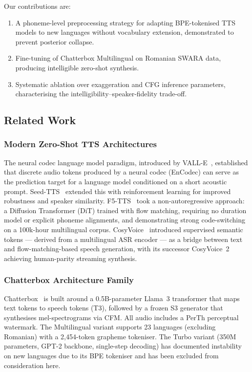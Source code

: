 \documentclass[conference]{IEEEtran}
\begin{document}
Our contributions are:
\begin{enumerate}
\item A phoneme-level preprocessing strategy for adapting
  BPE-tokenised TTS models to new languages without vocabulary
  extension, demonstrated to prevent posterior collapse.
\item Fine-tuning of Chatterbox Multilingual on Romanian SWARA data,
  producing intelligible zero-shot synthesis.
\item Systematic ablation over exaggeration and CFG inference
  parameters, characterising the intelligibility--speaker-fidelity
  trade-off.
\end{enumerate}

\subsection{Related Work}

\subsubsection{Modern Zero-Shot TTS Architectures}

The neural codec language model paradigm, introduced by VALL-E~\cite{valle},
established that discrete audio tokens produced by a neural codec
(EnCodec) can serve as the prediction target for a language model
conditioned on a short acoustic prompt.
Seed-TTS~\cite{seedtts} extended this with reinforcement learning
for improved robustness and speaker similarity.
F5-TTS~\cite{f5tts} took a non-autoregressive approach: a Diffusion
Transformer (DiT) trained with flow matching, requiring no duration
model or explicit phoneme alignments, and demonstrating strong
code-switching on a 100k-hour multilingual corpus.
CosyVoice~\cite{cosyvoice} introduced supervised semantic tokens —
derived from a multilingual ASR encoder — as a bridge between text
and flow-matching-based speech generation, with its successor
CosyVoice~2 achieving human-parity streaming synthesis.

\subsubsection{Chatterbox Architecture Family}

Chatterbox~\cite{chatterbox} is built around a 0.5B-parameter Llama~3
transformer that maps text tokens to speech tokens (T3), followed by
a frozen S3 generator that synthesises mel-spectrograms via CFM.
All audio includes a PerTh perceptual watermark.
The Multilingual variant supports 23 languages (excluding Romanian)
with a 2,454-token grapheme tokeniser.
The Turbo variant (350M parameters, GPT-2 backbone, single-step
decoding) has documented instability on new languages due to its
BPE tokeniser and has been excluded from consideration here.
\end{document}
